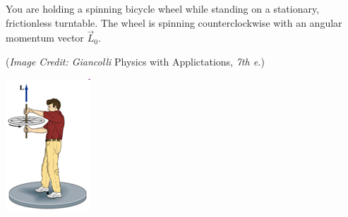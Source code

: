 \documentclass[10pt]{exam}
\begin{document}
\begin{questions}
\begin{multicols}{2}
  \end{multicols}

\vspace{2em}


\question
	You are holding a spinning bicycle wheel while standing on a stationary, frictionless turntable.  The wheel is spinning counterclockwise with an angular momentum vector $\vec{L}_0$. 
  
  {\small (\emph{Image Credit: Giancolli} Physics with Applictations, \emph{7th e.})}

  \begin{minipage}[b]{.7\textwidth}
  \end{minipage}
  \hfill
  \includegraphics{bicycle-wheel.png}




  


\end{questions}
\end{document}
